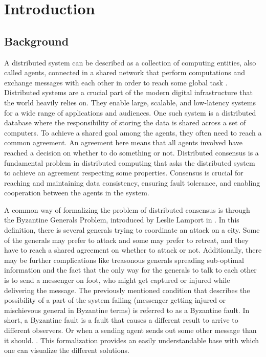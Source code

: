 \section{Introduction}
\thispagestyle{empty}

\subsection{Background}
A distributed system can be described as a collection of computing entities, also called agents, connected in a shared network that perform computations and exchange messages with each other in order to reach some global task \cite{Coulouris_systems_2005}. Distributed systems are a crucial part of the modern digital infrastructure that the world heavily relies on. They enable large, scalable, and low-latency systems for a wide range of applications and audiences. One such system is a distributed database where the responsibility of storing the data is shared across a set of computers. To achieve a shared goal among the agents, they often need to reach a common agreement. An agreement here means that all agents involved have reached a decision on whether to do something or not. Distributed consensus is a fundamental problem in distributed computing that asks the distributed system to achieve an agreement respecting some properties. Consensus is crucial for reaching and maintaining data consistency, ensuring fault tolerance, and enabling cooperation between the agents in the system. \cite{Lynch_distributed_2017}

A common way of formalizing the problem of distributed consensus is through the Byzantine Generals Problem, introduced by Leslie Lamport in \cite{lamportByzantineGeneralsProblem}. In this definition, there is several generals trying to coordinate an attack on a city. Some of the generals may prefer to attack and some may prefer to retreat, and they have to reach a shared agreement on whether to attack or not. Additionally, there may be further complications like treasonous generals spreading sub-optimal information and the fact that the only way for the generals to talk to each other is to send a messenger on foot, who might get captured or injured while delivering the message. 
The previously mentioned condition that describes the possibility of a part of the system failing (messenger getting injured or mischievous general in Byzantine terms) is referred to as a Byzantine fault. In short, a Byzantine fault is a fault that causes a different result to arrive to different observers. Or when a sending agent sends out some other message than it should. \cite{driscollRealByzantineGenerals2004}. 
This formalization provides an easily understandable base with which one can visualize the different solutions.

